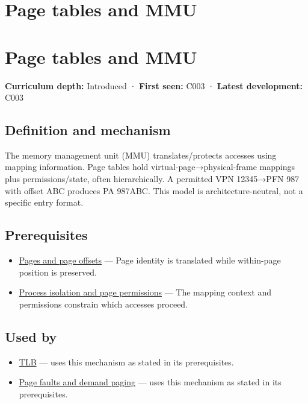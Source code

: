 \hypertarget{appendix-01e5905165c4}{}
\section*{Page tables and MMU}
\section{Page tables and MMU}\label{appendix-01e5905165c4-page-tables-and-mmu}

\textbf{Curriculum depth:} Introduced · \textbf{First seen:} C003 · \textbf{Latest development:} C003

\subsection{Definition and mechanism}\label{appendix-01e5905165c4-definition-and-mechanism}

The memory management unit (MMU) translates/protects accesses using mapping information. Page tables hold virtual-page→physical-frame mappings plus permissions/state, often hierarchically. A permitted VPN 12345→PFN 987 with offset ABC produces PA 987ABC. This model is architecture-neutral, not a specific entry format.

\subsection{Prerequisites}\label{appendix-01e5905165c4-prerequisites}

\begin{itemize}
\tightlist
\item
  \hyperref[appendix-0c67cd5bf30a]{Pages and page offsets} --- Page identity is translated while within-page position is preserved.
\item
  \hyperref[appendix-c2a9ad1e2b49]{Process isolation and page permissions} --- The mapping context and permissions constrain which accesses proceed.
\end{itemize}

\subsection{Used by}\label{appendix-01e5905165c4-used-by}

\begin{itemize}
\tightlist
\item
  \hyperref[appendix-7a2d9c5ce511]{TLB} --- uses this mechanism as stated in its prerequisites.
\item
  \hyperref[appendix-cc0909a7ef14]{Page faults and demand paging} --- uses this mechanism as stated in its prerequisites.
\end{itemize}

